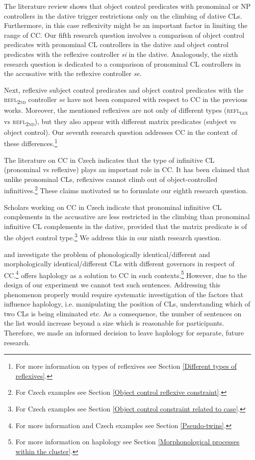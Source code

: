 The literature review shows that object control predicates with pronominal or NP controllers in the dative trigger restrictions only on the climbing of dative CLs. Furthermore, in this case reflexivity might be an important factor in limiting the range of CC. Our fifth research question involves a comparison of object control predicates with pronominal CL controllers in the dative and object control predicates with the reflexive controller \textit{si} in the dative. Analogously, the sixth research question is dedicated to a comparison of pronominal CL controllers in the accusative with the reflexive controller \textit{se}.

Next, reflexive subject control predicates and object control predicates with the \textsc{refl\textsubscript{2nd}} controller \textit{se} have not been compared with respect to CC in the previous works. Moreover, the mentioned reflexives are not only of different types (\textsc{refl\textsubscript{\textsc{lex}}} vs \textsc{refl\textsubscript{2nd}}), but they also appear with different matrix predicates (subject vs object control). Our seventh research question addresses CC in the context of these differences.\footnote{For more information on types of reflexives see Section \ref{Different types of reflexives}.}

The literature on CC in Czech indicates that the type of infinitive CL (pronominal vs reflexive) plays an important role in CC. It has been claimed that unlike pronominal CLs, reflexives cannot climb out of object-controlled infinitives.\footnote{For Czech examples see Section \ref{Object control reflexive constraint}.} These claims motivated us to formulate our eighth research question.

Scholars working on CC in Czech indicate that pronominal infinitive CL complements in the accusative are less restricted in the climbing than pronominal infinitive CL complements in the dative, provided that the matrix predicate is of the object control type.\footnote{For Czech examples see Section \ref{Object control constraint related to case}.} We address this in our ninth research question.

\begin{sloppypar}
\citet[][]{Junghanns02} and \citet[][]{Rosen14} investigate the problem of phonologically identical/different and morphologically identical/different CLs with different governors in respect of CC.\footnote{For more information and Czech examples see Section \ref{Pseudo-twins}.} \citet[][]{Rosen14} offers haplology as a solution to CC in such contexts.\footnote{For more information on haplology see Section \ref{Morphonological processes within the cluster}.} However, due to the design of our experiment we cannot test such sentences. Addressing this phenomenon properly would require systematic investigation of the factors that influence haplology, i.e. manipulating the position of CLs, understanding which of two CLs is being eliminated etc. As a consequence, the number of sentences on the list would increase beyond a size which is reasonable for participants. Therefore, we made an informed decision to leave haplology for separate, future research. 
\end{sloppypar}

